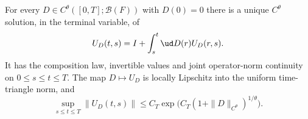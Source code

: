 \begin{proposition}\label{P:constant-young-linear}
  For every $D\in C^\theta([0,T];\mathcal B(F))$ with $D(0)=0$
  there is a unique $C^\theta$ solution, in the terminal variable, of
  \begin{equation}\label{E:constant-young-equation}
    U_D(t,s)=I+\int_s^t\ud D(r)U_D(r,s).
  \end{equation}
  It has the composition law, invertible values and joint operator-norm
  continuity on $0\le s\le t\le T$. The map $D\mapsto U_D$ is locally
  Lipschitz into the uniform time-triangle norm, and
  \begin{equation}\label{E:constant-young-growth}
    \sup_{s\le t\le T}\|U_D(t,s)\|
    \le C_T\exp\big(C_T(1+\|D\|_{C^\theta})^{1/\theta}\big).
  \end{equation}
\end{proposition}

